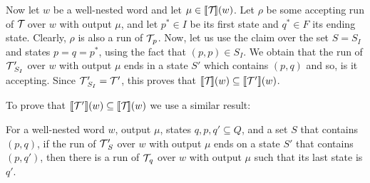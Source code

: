 	Now let $w$ be a well-nested word and let $\mu \in \llbracket \mathcal{T}\! \rrbracket(w)$. Let $\rho$ be some accepting run of $\mathcal{T}\!$ over $w$ with output $\mu$, and let $p^*\in I$ be its first state and $q^*\in F$ its ending state. 
	Clearly, $\rho$ is also a run of $\mathcal{T}\!_p$.
	Now, let us use the claim over the set $S = S_{I}$ and states $p = q = p^*$, using the fact that $(p,p)\in S_{I}$.
	We obtain that the run of $\mathcal{T}\!\,'_{S_I}$ over $w$ with output $\mu$ ends in a state $S'$ which contains $(p,q)$ and so, is it accepting.
	Since $\mathcal{T}\!\,'_{S_I} = \mathcal{T}\!\,'$, this proves that $\llbracket \mathcal{T}\! \rrbracket(w) \subseteq \llbracket \mathcal{T}\!\,' \rrbracket(w)$.
	
	
	To prove that $\llbracket \mathcal{T}\!\,' \rrbracket(w) \subseteq \llbracket \mathcal{T}\! \rrbracket(w)$ we use a similar result:
	
	\begin{claim}
		For a well-nested word $w$, output $\mu$, states $q,p,q'\subseteq Q$, and a set $S$ that contains $(p,q)$, if the run of $\mathcal{T}\!\,'_S$ over $w$ with output $\mu$ ends on a state $S'$ that contains $(p,q')$, then there is a run of $\mathcal{T}\!_q$ over $w$ with output $\mu$ such that its last state is $q'$.
	\end{claim}
